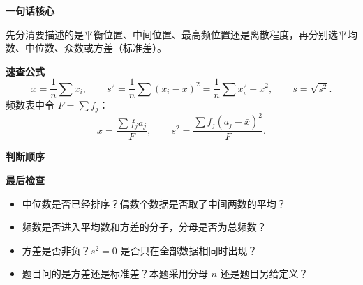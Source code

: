 \clearpage
\begin{summarybox}

	\textbf{\textcolor{CSummary}{一句话核心}}

	先分清要描述的是平衡位置、中间位置、最高频位置还是离散程度，再分别选平均数、中位数、众数或方差（标准差）。

	\medskip
	\textbf{\textcolor{CSummary}{速查公式}}
	\[
		\bar x=\frac1n\sum x_i,
		\qquad
		s^2=\frac1n\sum(x_i-\bar x)^2
		=\frac1n\sum x_i^2-\bar x^2,
		\qquad s=\sqrt{s^2}.
	\]
	频数表中令 $F=\sum f_j$：
	\[
		\bar x=\frac{\sum f_ja_j}{F},
		\qquad
		s^2=\frac{\sum f_j(a_j-\bar x)^2}{F}.
	\]

	\medskip
	\textbf{\textcolor{CSummary}{判断顺序}}
	

	\medskip
	\textbf{\textcolor{CSummary}{最后检查}}
	\begin{itemize}[leftmargin=*,itemsep=0.35em,topsep=0.35em]
		\item 中位数是否已经排序？偶数个数据是否取了中间两数的平均？
		\item 频数是否进入平均数和方差的分子，分母是否为总频数？
		\item 方差是否非负？$s^2=0$ 是否只在全部数据相同时出现？
		\item 题目问的是方差还是标准差？本题采用分母 $n$ 还是题目另给定义？
	\end{itemize}

\end{summarybox}
